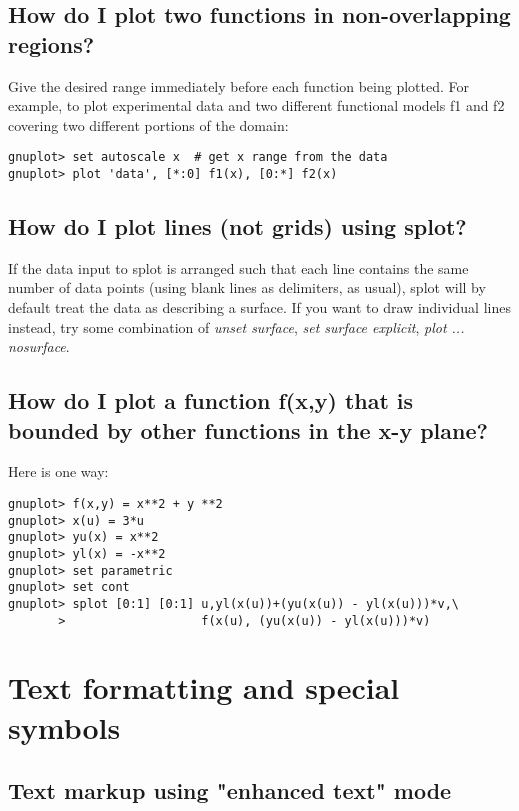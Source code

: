 \documentclass[a4paper,11pt]{article}
\begin{document}
\subsection{How do I plot two functions in non-overlapping regions?}

Give the desired range immediately before each function being plotted.
For example, to plot experimental data and two different functional
models f1 and f2 covering two different portions of the domain:
\small
\begin{verbatim}
gnuplot> set autoscale x  # get x range from the data
gnuplot> plot 'data', [*:0] f1(x), [0:*] f2(x)
\end{verbatim}
\normalsize


\subsection{How do I plot lines (not grids) using splot?}

If the data input to splot is arranged such that each line contains
the same number of data points (using blank lines as delimiters, as usual),
splot will by default treat the data as describing a surface.
If you want to draw individual lines instead, try some combination of
\textit{unset surface}, \textit{set surface explicit}, \textit{plot ... nosurface}.


\subsection{How do I plot a function f(x,y) that is bounded by other
          functions in the x-y plane?}

Here is one way:
\small
\begin{verbatim}
gnuplot> f(x,y) = x**2 + y **2
gnuplot> x(u) = 3*u
gnuplot> yu(x) = x**2
gnuplot> yl(x) = -x**2
gnuplot> set parametric
gnuplot> set cont
gnuplot> splot [0:1] [0:1] u,yl(x(u))+(yu(x(u)) - yl(x(u)))*v,\
       >                   f(x(u), (yu(x(u)) - yl(x(u)))*v)
\end{verbatim}
\normalsize


\section{Text formatting and special symbols}

\subsection{Text markup using "enhanced text" mode}
\end{document}
